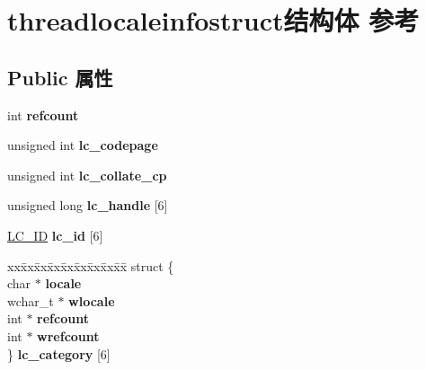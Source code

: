 \hypertarget{structthreadlocaleinfostruct}{}\section{threadlocaleinfostruct结构体 参考}
\label{structthreadlocaleinfostruct}
\subsection*{Public 属性}
\begin{DoxyCompactItemize}
\item 
\mbox{\label{structthreadlocaleinfostruct_a5691a6a4d2429188110b0f4d23791951}} 
int {\bfseries refcount}
\item 
\mbox{\label{structthreadlocaleinfostruct_a24295baf455bb95f1f95640a047830d5}} 
unsigned int {\bfseries lc\+\_\+codepage}
\item 
\mbox{\label{structthreadlocaleinfostruct_a1ab3d552174277eefe201dd6c985471f}} 
unsigned int {\bfseries lc\+\_\+collate\+\_\+cp}
\item 
\mbox{\label{structthreadlocaleinfostruct_a993cfe2fc2ceff66b5430ea2f06cb01a}} 
unsigned long {\bfseries lc\+\_\+handle} \mbox{[}6\mbox{]}
\item 
\mbox{\label{structthreadlocaleinfostruct_aafd7d8ee464a87756c5912efb2dd9055}} 
\hyperlink{structtag_l_c___i_d}{L\+C\+\_\+\+ID} {\bfseries lc\+\_\+id} \mbox{[}6\mbox{]}
\item 
\mbox{\label{structthreadlocaleinfostruct_a9970058f8499407578ef01955860a651}} 
\begin{tabbing}
xx\=xx\=xx\=xx\=xx\=xx\=xx\=xx\=xx\=\kill
struct \{\\
\>char $\ast$ {\bfseries locale}\\
\>wchar\_t $\ast$ {\bfseries wlocale}\\
\>int $\ast$ {\bfseries refcount}\\
\>int $\ast$ {\bfseries wrefcount}\\
\} {\bfseries lc\_category} \mbox{[}6\mbox{]}\\


\end{tabbing}
\end{DoxyCompactItemize}
